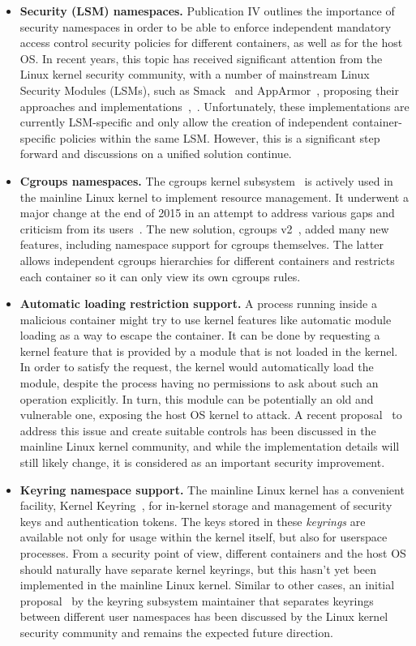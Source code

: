 \begin{itemize}
	\item \textbf{Security (LSM) namespaces.} Publication IV outlines the importance of security namespaces in order to be able to enforce independent mandatory access control security policies for different containers, as well as for the host OS. In recent years, this topic has received significant attention from the Linux kernel security community, with a number of mainstream Linux Security Modules (LSMs), such as Smack~\cite{smack} and AppArmor~\cite{bauer2006paranoid}, proposing their approaches and implementations~\cite{smackns},~\cite{apparmorns}. Unfortunately, these implementations are currently LSM-specific and only allow the creation of independent container-specific policies within the same LSM. However, this is a significant step forward and discussions on a unified solution continue.
	\item \textbf{Cgroups namespaces.} The cgroups kernel subsystem~\cite{cgroupsv2} is actively used in the mainline Linux kernel to implement resource management. It underwent a major change at the end of 2015 in an attempt to address various gaps and criticism from its users~\cite{rosen2016}. The new solution, cgroups v2~\cite{cgroupsv2}, added many new features, including namespace support for cgroups themselves. The latter allows independent cgroups hierarchies for different containers and restricts each container so it can only view its own cgroups rules. 
	\item \textbf{Automatic loading restriction support.} A process running inside a malicious container might try to use kernel features like automatic module loading as a way to escape the container. It can be done by requesting a kernel feature that is provided by a module that is not loaded in the kernel. In order to satisfy the request, the kernel would automatically load the module, despite the process having no permissions to ask about such an operation explicitly. In turn, this module can be potentially an old and vulnerable one, exposing the host OS kernel to attack. A recent proposal~\cite{harouni2017} to address this issue and create suitable controls has been discussed in the mainline Linux kernel community, and while the implementation details will still likely change, it is considered as an important security improvement. 
  \item \textbf{Keyring namespace support.} The mainline Linux kernel has a convenient facility, Kernel Keyring~\cite{keyrings}, for in-kernel storage and management of security keys and authentication tokens. The keys stored in these \textit{keyrings} are available not only for usage within the kernel itself, but also for userspace processes. From a security point of view, different containers and the host OS should naturally have separate kernel keyrings, but this hasn't yet been implemented in the mainline Linux kernel. Similar to other cases, an initial proposal~\cite{howells2016} by the keyring subsystem maintainer that separates keyrings between different user namespaces has been discussed by the Linux kernel security community and remains the expected future direction. 

\end{itemize}
